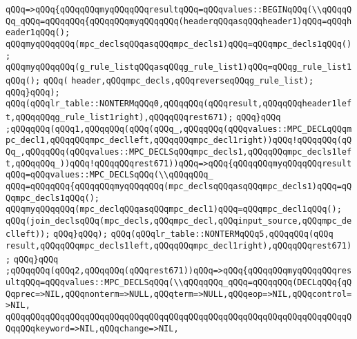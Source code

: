 \verb|qQQq=>qQQq{qQQqqQQqmyqQQqqQQqresultqQQq=qQQqvalues::BEGINqQQq(\\qQQqqQQq_qQQq=qQQqqQQq{qQQqqQQqmyqQQqqQQq(headerqQQqasqQQqheader1)qQQq=qQQqheader1qQQq();|\newline
\verb|qQQqmyqQQqqQQq(mpc_declsqQQqasqQQqmpc_decls1)qQQq=qQQqmpc_decls1qQQq();|\newline
\verb|qQQqmyqQQqqQQq(g_rule_listqQQqasqQQqg_rule_list1)qQQq=qQQqg_rule_list1qQQq();|\newline
\verb|qQQq(|\newline
\verb|header,qQQqmpc_decls,qQQqreverseqQQqg_rule_list);|\newline
\verb|qQQq}qQQq);|\newline
\verb|qQQq(qQQqlr_table::NONTERMqQQq0,qQQqqQQq(qQQqresult,qQQqqQQqheader1left,qQQqqQQqg_rule_list1right),qQQqqQQqrest671);|\newline
\verb|qQQq}qQQq|\newline
\verb|;qQQqqQQq(qQQq1,qQQqqQQq(qQQq(qQQq_,qQQqqQQq(qQQqvalues::MPC_DECLqQQqmpc_decl1,qQQqqQQqmpc_declleft,qQQqqQQqmpc_decl1right))qQQq!qQQqqQQq(qQQq_,qQQqqQQq(qQQqvalues::MPC_DECLSqQQqmpc_decls1,qQQqqQQqmpc_decls1left,qQQqqQQq_))qQQq!qQQqqQQqrest671))qQQq=>qQQq{qQQqqQQqmyqQQqqQQqresultqQQq=qQQqvalues::MPC_DECLSqQQq(\\qQQqqQQq_|\newline
\verb|qQQq=qQQqqQQq{qQQqqQQqmyqQQqqQQq(mpc_declsqQQqasqQQqmpc_decls1)qQQq=qQQqmpc_decls1qQQq();|\newline
\verb|qQQqmyqQQqqQQq(mpc_declqQQqasqQQqmpc_decl1)qQQq=qQQqmpc_decl1qQQq();|\newline
\verb|qQQq(join_declsqQQq(mpc_decls,qQQqmpc_decl,qQQqinput_source,qQQqmpc_declleft));|\newline
\verb|qQQq}qQQq);|\newline
\verb|qQQq(qQQqlr_table::NONTERMqQQq5,qQQqqQQq(qQQq|\newline
\verb|result,qQQqqQQqmpc_decls1left,qQQqqQQqmpc_decl1right),qQQqqQQqrest671);|\newline
\verb|qQQq}qQQq|\newline
\verb|;qQQqqQQq(qQQq2,qQQqqQQq(qQQqrest671))qQQq=>qQQq{qQQqqQQqmyqQQqqQQqresultqQQq=qQQqvalues::MPC_DECLSqQQq(\\qQQqqQQq_qQQq=qQQqqQQq(DECLqQQq{qQQqprec=>NIL,qQQqnonterm=>NULL,qQQqterm=>NULL,qQQqeop=>NIL,qQQqcontrol=>NIL,|\newline
\verb|qQQqqQQqqQQqqQQqqQQqqQQqqQQqqQQqqQQqqQQqqQQqqQQqqQQqqQQqqQQqqQQqqQQqqQQqqQQqkeyword=>NIL,qQQqchange=>NIL,|\newline
